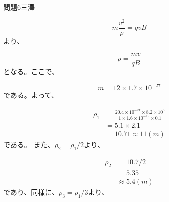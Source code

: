 \documentclass[fleqn]{jbook}
\begin{document}
\begin{answer}{問題6}{三澤}
\begin{enumerate}
\begin{equation}
 m\frac{v^2}{\rho}=qvB
\end{equation}
より、

\begin{equation}
 \rho=\frac{mv}{qB}
\end{equation}
となる。ここで、

\begin{equation}
 m=12\times 1.7\times 10^{-27}
\end{equation}
である。よって、

\begin{equation}
 \begin{split}
  \rho_1&=\frac{20.4\times10^{-27}\times 8.2\times 10^{6} }{1\times 1.6\times 
10^{-19}\times 0.1} \\
   &=5.1\times 2.1 \\ 
   &=10.71\approx 11(m) 
 \end{split}
\end{equation}
である。
また、$\rho_2=\rho_1/2$より、

\begin{equation}
 \begin{split}
  \rho_2&=10.7/2 \\
        &=5.35 \\
        &\approx 5.4(m)
 \end{split}
\end{equation}
であり、同様に、$\rho_3=\rho_1/3$より、


\end{enumerate}
\end{answer}
\end{document}
